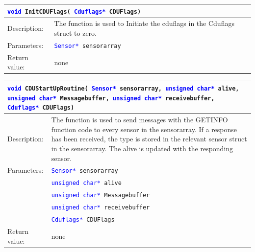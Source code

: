 \begin{table}[H]
\begin{tabular}{l p{12.5cm}}
\multicolumn{2}{l}{\texttt{\textcolor{blue}{void} InitCDUFlags( \texttt{\textcolor{blue}{Cduflags*} CDUFlags})}} \\
\hline
Description:& The function is used to Initiate the cduflags in the Cduflags struct to zero.\\
Parameters:&\texttt{\textcolor{blue}{Sensor*} sensorarray}\\
Return value:&none\\
\end{tabular}
\end{table}

\begin{table}[H]
\begin{tabular}{l p{12.5cm}}
\multicolumn{2}{p{15cm}}{\texttt{\textcolor{blue}{void} CDUStartUpRoutine( \texttt{\textcolor{blue}{Sensor*} sensorarray, \textcolor{blue}{unsigned char*} alive, \textcolor{blue}{unsigned char*} Messagebuffer, \textcolor{blue}{unsigned char*} receivebuffer, \textcolor{blue}{Cduflags*} CDUFlags})}} \\
\hline
Description:& The function is used to send messages with the GETINFO function code to every sensor in the sensorarray. If a response has been received, the type is stored in the relevant sensor struct in the sensorarray. The alive is updated with the responding sensor.\\
Parameters:&\texttt{\textcolor{blue}{Sensor*} sensorarray}\\
&\texttt{\textcolor{blue}{unsigned char*} alive}\\
&\texttt{\textcolor{blue}{unsigned char*} Messagebuffer}\\
&\texttt{\textcolor{blue}{unsigned char*} receivebuffer}\\
&\texttt{\textcolor{blue}{Cduflags*} CDUFlags}\\
Return value:&none\\
\end{tabular}
\end{table}

